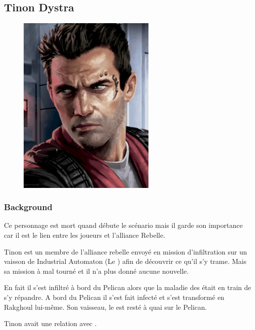 \subsection{Tinon Dystra} \label{sec:tinon-dystra}
\begin{figure}[h!]
    \centering
    \includegraphics[height=250pt]{_img/pnjs/tinon-dystra.png}
\end{figure}

\subsubsection{Background}
Ce personnage est mort quand débute le scénario mais il garde son importance car il est le lien entre les joueurs et l'alliance Rebelle.

Tinon est un membre de l'alliance rebelle envoyé en mission d'infiltration sur un vaisson de Industrial Automaton (Le ) afin de découvrir ce qu'il s'y trame. Mais sa mission à mal tourné et il n'a plus donné aucune nouvelle. 

En fait il s'est infiltré à bord du Pelican alors que la maladie des  était en train de s'y répandre. A bord du Pelican il s'est fait infecté et s'est transformé en Rakghoul lui-même. Son vaisseau, le  est resté à quai sur le Pelican.

Tinon avait une relation avec .

\newpage
